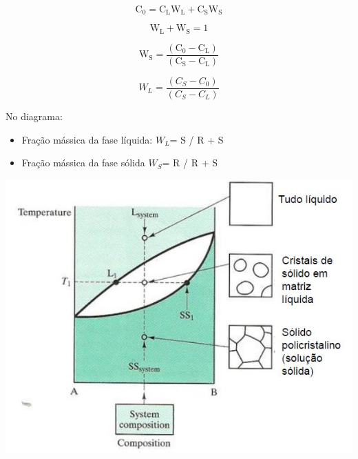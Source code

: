 \begin{equation}\label{key}
\mathrm{C}_{0}=\mathrm{C}_{\mathrm{L}} \mathrm{W}_{\mathrm{L}}+\mathrm{C}_{\mathrm{S}} \mathrm{W}_{\mathrm{S}}
\end{equation}

\begin{equation}\label{key}
\mathrm{W}_{\mathrm{L}}+\mathrm{W}_{\mathrm{S}}=1
\end{equation}

\begin{equation}\label{key}
\mathrm{W}_{\mathrm{S}}=\frac{\left(\mathrm{C}_{0}-\mathrm{C}_{\mathrm{L}}\right) }{\left(\mathrm{C}_{\mathrm{S}}-\mathrm{C}_{\mathrm{L}}\right)}
\end{equation}

\begin{equation}\label{key}
W_{L}=\frac{\left(C_{S}-C_{0}\right) }{\left(C_{S}-C_{L}\right)}
\end{equation}

No diagrama:

\begin{itemize}
	\item Fração mássica da fase líquida: $W_{L}$= S / R + S
	\item Fração mássica da fase sólida $W_{S}$= R / R + S
\end{itemize}



\includegraphics[scale=0.4,trim={0 0 0 0}]{figures/fases}

